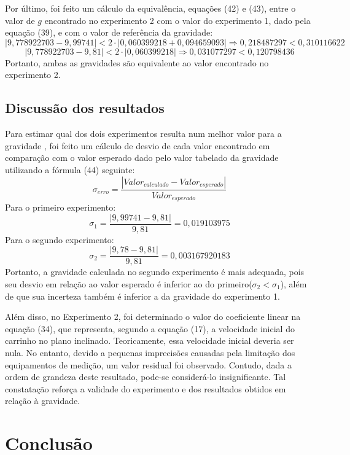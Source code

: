 \documentclass[12pt, letterpaper]{article}
\begin{document}
    Por último, foi feito um cálculo da equivalência, equações (42) e (43), entre o valor de $g$ encontrado no experimento 2 com o valor do experimento 1, dado pela equação (39), e com o valor de referência da gravidade:
    \begin{equation}
        |9,778922703 - 9,99741| < 2\cdot |0,060399218 + 0,094659093| \Rightarrow 0,218487297 < 0,310116622
    \end{equation}
    \begin{equation}
        |9,778922703 - 9,81| < 2\cdot |0,060399218| \Rightarrow 0,031077297 < 0,120798436
    \end{equation}
    Portanto, ambas as gravidades são equivalente ao valor encontrado no experimento 2.
    \subsection{Discussão dos resultados}
    Para estimar qual dos dois experimentos resulta num melhor valor para a gravidade , foi feito um cálculo de desvio de cada valor encontrado em comparação com o valor esperado dado pelo valor tabelado da gravidade utilizando a fórmula (44) seguinte:
    \begin{equation}
        \sigma_{erro} = \frac{|Valor_{calculado} - Valor_{esperado}|}{Valor_{esperado}}
    \end{equation}
    Para o primeiro experimento:
    \[
        \sigma_{1} = \frac{|9,99741 - 9,81|}{9,81} = 0,019103975
    \]
    Para o segundo experimento:
    \[
        \sigma_{2} = \frac{|9,78 - 9,81|}{9,81} = 0,003167920183
    \]
    Portanto, a gravidade calculada no segundo experimento é mais adequada, pois seu desvio em relação ao valor esperado é inferior ao do primeiro($\sigma_2 < \sigma_1$), além de que sua incerteza também é inferior a da gravidade do experimento 1.

    Além disso, no Experimento 2, foi determinado o valor do coeficiente linear na equação (34), que representa, segundo a equação (17), a velocidade inicial do carrinho no plano inclinado. Teoricamente, essa velocidade inicial deveria ser nula. No entanto, devido a pequenas imprecisões causadas pela limitação dos equipamentos de medição, um valor residual foi observado. Contudo, dada a ordem de grandeza deste resultado, pode-se considerá-lo insignificante. Tal constatação reforça a validade do experimento e dos resultados obtidos em relação à gravidade.

\section{Conclusão}
\end{document}
